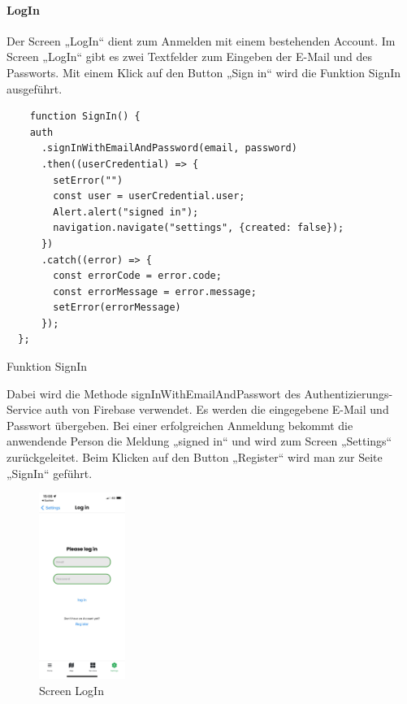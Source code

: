 \paragraph{LogIn}Der Screen „LogIn“ dient zum Anmelden mit einem bestehenden Account. Im Screen „LogIn“ gibt es zwei Textfelder zum Eingeben der E-Mail und des Passworts.
\noindent Mit einem Klick auf den Button „Sign in“ wird die Funktion SignIn ausgeführt.

\begin{listing}[H]
  \begin{verbatim}
    function SignIn() {
    auth
      .signInWithEmailAndPassword(email, password)
      .then((userCredential) => {
        setError("")
        const user = userCredential.user;
        Alert.alert("signed in");
        navigation.navigate("settings", {created: false});
      })
      .catch((error) => {
        const errorCode = error.code;
        const errorMessage = error.message;
        setError(errorMessage)
      });
  };
\end{verbatim}
  \caption{Funktion SignIn}
  \label{lst:signin}
\end{listing}

Dabei wird die Methode signInWithEmailAndPasswort des Authentizierungs-Service auth von Firebase verwendet. Es werden die eingegebene E-Mail und Passwort übergeben. Bei einer erfolgreichen Anmeldung bekommt die anwendende Person die Meldung „signed in“ und wird zum Screen „Settings“ zurückgeleitet.
\noindent Beim Klicken auf den Button „Register“ wird man zur Seite „SignIn“ geführt.

\begin{figure}[H]
  \centering
  \includegraphics[width=0.25\textwidth]{images/app-screenshots/screenlogin.png}
  \caption{Screen LogIn}
  \label{fig:login}
\end{figure}

